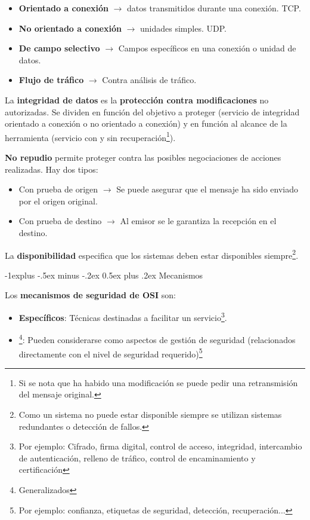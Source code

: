\documentclass[10pt,portrait, twocolumn]{article}
\makeatletter
\renewcommand{\subsection}{\@startsection{subsection}{2}{0mm}%
                                {-1explus -.5ex minus -.2ex}%
                                {0.5ex plus .2ex}%
                                {\normalfont\normalsize\bfseries}}
\makeatother
\begin{document}
		\begin{itemize}
			\item \textbf{Orientado a conexión} $\rightarrow$ datos transmitidos durante una conexión. TCP.
			\item \textbf{No orientado a conexión} $\rightarrow$ unidades simples. UDP.
			\item \textbf{De campo selectivo} $\rightarrow$ Campos específicos en una conexión o unidad de datos.
			\item \textbf{Flujo de tráfico} $\rightarrow$ Contra análisis de tráfico.
		\end{itemize}
		
La \textbf{integridad de datos} es la \textbf{protección contra modificaciones} no autorizadas. Se dividen en función del objetivo a proteger (servicio de integridad orientado a conexión o no orientado a conexión) y en función al alcance de la herramienta (servicio con y sin recuperación\footnote{Si se nota que ha habido una modificación se puede pedir una retransmisión del mensaje original.}).
		
\quad \textbf{No repudio} permite proteger contra las posibles negociaciones de acciones realizadas. Hay dos tipos: 
	
		\begin{itemize}
			\item Con prueba de origen $\rightarrow$ Se puede asegurar que el mensaje ha sido enviado por el origen original.
			\item Con prueba de destino $\rightarrow$ Al emisor se le garantiza la recepción en el destino.
		\end{itemize}	
		
La \textbf{disponibilidad} especifica que los sistemas deben estar disponibles siempre\footnote{Como un sistema no puede estar disponible siempre se utilizan sistemas redundantes o detección de fallos.}.
		
\subsection{Mecanismos}

Los \textbf{mecanismos de seguridad de OSI} son:

	\begin{itemize}
		\item \textbf{Específicos}: Técnicas destinadas a facilitar un servicio\footnote{Por ejemplo: Cifrado, firma digital, control de acceso, integridad, intercambio de autenticación, relleno de tráfico, control de encaminamiento y certificación}.
		\item \footnote{Generalizados}: Pueden considerarse como aspectos de gestión de seguridad (relacionados directamente con el nivel de seguridad requerido)\footnote{Por ejemplo: confianza, etiquetas de seguridad, detección, recuperación...}
	\end{itemize}
	
\end{document}
